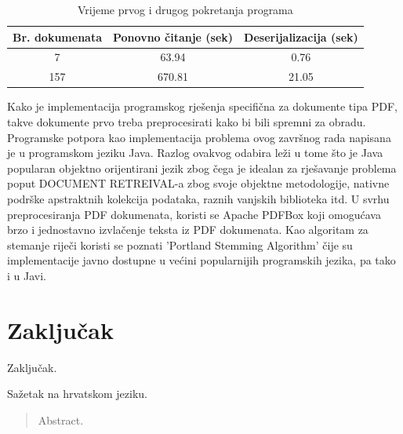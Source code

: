 \documentclass[times, utf8, zavrsni]{fer}
\begin{document}
\begin{table}
\begin{center}
\begin{tabular}{|c|c|c|}
\hline
Br. dokumenata & Ponovno čitanje (sek) & Deserijalizacija (sek) \\
\hline
7 & 63.94 & 0.76 \\
157 & 670.81 & 21.05 \\
\hline
\end{tabular}
\end{center}
\caption{Vrijeme prvog i drugog pokretanja programa}
\end{table} 

Kako je implementacija programskog rješenja specifična za dokumente tipa PDF, takve dokumente prvo treba preprocesirati kako bi bili spremni za obradu.
Programske potpora kao implementacija problema ovog završnog rada napisana je u programskom jeziku Java. Razlog ovakvog odabira leži u tome što je Java popularan objektno orijentirani jezik zbog čega je idealan za rješavanje problema poput DOCUMENT RETREIVAL-a zbog svoje objektne metodologije, nativne podrške apstraktnih kolekcija podataka, raznih vanjskih biblioteka itd.
U svrhu preprocesiranja PDF dokumenata, koristi se Apache PDFBox koji omogućava brzo i jednostavno izvlačenje teksta iz PDF dokumenata.
Kao algoritam za stemanje riječi koristi se poznati 'Portland Stemming Algorithm' čije su implementacije javno dostupne u većini popularnijih programskih jezika, pa tako i u Javi.

\chapter{Zaključak}
Zaključak.




\begin{sazetak}
Sažetak na hrvatskom jeziku.

\end{sazetak}

\begin{abstract}
Abstract.

\end{abstract}
\end{document}
